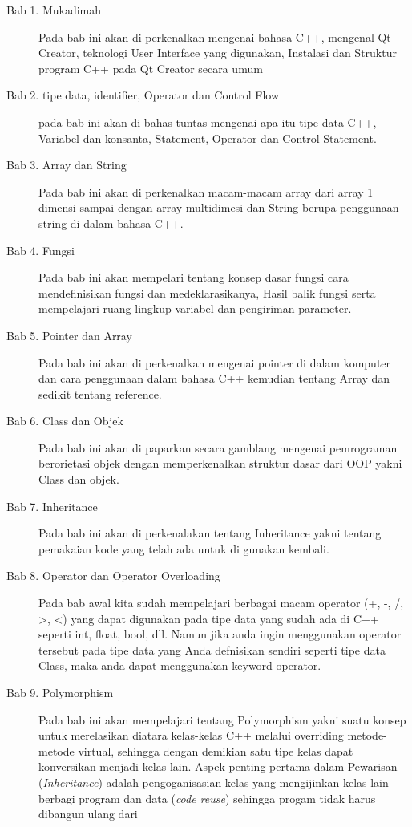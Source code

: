 \begin{description}
	\item[Bab 1. Mukadimah] Pada bab ini akan di perkenalkan mengenai
	 bahasa C++, mengenal Qt Creator, teknologi User Interface yang 
	 digunakan, Instalasi dan Struktur program C++ pada Qt Creator secara umum 
	\item[Bab 2. tipe data, identifier, Operator dan Control Flow] 
	pada bab ini akan di bahas tuntas mengenai apa itu tipe data C++, 
	Variabel dan konsanta, Statement, Operator dan Control Statement.
	\item[Bab 3. Array dan String] Pada bab ini akan di perkenalkan 
	macam-macam array dari array 1 dimensi sampai dengan array 
	multidimesi dan String berupa penggunaan string di dalam bahasa C++.
	\item[Bab 4. Fungsi] Pada bab ini akan mempelari tentang konsep dasar
	fungsi cara mendefinisikan fungsi dan medeklarasikanya, Hasil balik
	fungsi serta mempelajari ruang lingkup variabel dan pengiriman parameter.
	\item[Bab 5. Pointer dan Array] Pada bab ini akan di perkenalkan mengenai
	pointer di dalam komputer dan cara penggunaan dalam bahasa C++ kemudian
	tentang Array dan sedikit tentang reference.
	\item[Bab 6. Class dan Objek] Pada bab ini akan di paparkan secara gamblang
	mengenai pemrograman berorietasi objek dengan memperkenalkan struktur dasar
	dari OOP yakni Class dan objek.
	\item[Bab 7. Inheritance] Pada bab ini akan di perkenalakan tentang Inheritance
	yakni tentang pemakaian kode yang telah ada untuk di gunakan kembali.
	\item[Bab 8. Operator dan Operator Overloading] Pada bab awal kita sudah 
	mempelajari berbagai macam operator (+, -, /, >, <) yang dapat digunakan
	pada tipe data yang sudah ada di C++ seperti int, float, bool, dll. 
	Namun jika anda ingin menggunakan operator tersebut pada tipe data yang 
	Anda defnisikan sendiri seperti tipe data Class, maka anda dapat 
	menggunakan keyword operator.
	\item[Bab 9. Polymorphism] Pada bab ini akan mempelajari tentang Polymorphism
	yakni suatu konsep untuk merelasikan
diatara kelas-kelas C++ melalui overriding metode-metode virtual,
sehingga dengan demikian satu tipe kelas dapat konversikan menjadi kelas
lain. Aspek penting pertama dalam Pewarisan (\emph{Inheritance}) adalah
pengoganisasian kelas yang mengijinkan kelas lain berbagi program dan
data (\emph{code reuse}) sehingga progam tidak harus dibangun ulang dari

\end{description}
